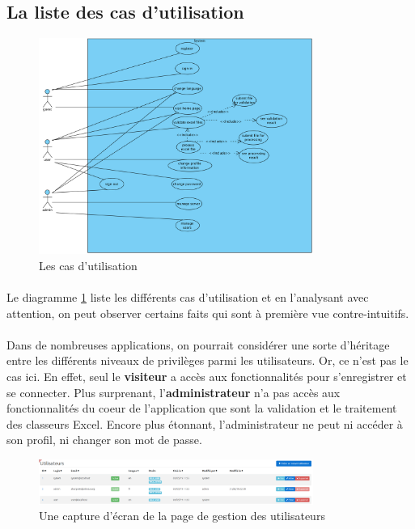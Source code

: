 \subsection{La liste des cas d'utilisation}
\label{subsec:use-cases-list}

\begin{figure}[ht]
    \centering
    \includegraphics[width=0.8\textwidth]{images/diagrams/use-cases-macro.png}
    \caption{Les cas d'utilisation}
    \label{fig:use-cases-macro}
\end{figure}

\paragraph{}
Le diagramme \ref{fig:use-cases-macro} liste les différents cas d'utilisation et en l'analysant avec attention, on peut observer certains faits qui sont à première vue contre-intuitifs.

\paragraph{}
Dans de nombreuses applications, on pourrait considérer une sorte d'héritage entre les différents niveaux de privilèges parmi les utilisateurs. Or, ce n'est pas le cas ici. En effet, seul le \textbf{visiteur} a accès aux fonctionnalités pour s'enregistrer et se connecter. Plus surprenant, l'\textbf{administrateur} n'a pas accès aux fonctionnalités du coeur de l'application que sont la validation et le traitement des classeurs Excel. Encore plus étonnant, l'administrateur ne peut ni accéder à son profil, ni changer son mot de passe.

\begin{figure}[ht]
    \centering
    \includegraphics[width=0.8\textwidth]{images/screenshot/screenshot-user-admin-page.png}
    \caption{Une capture d'écran de la page de gestion des utilisateurs}
    \label{fig:user-admin-page}
\end{figure}

